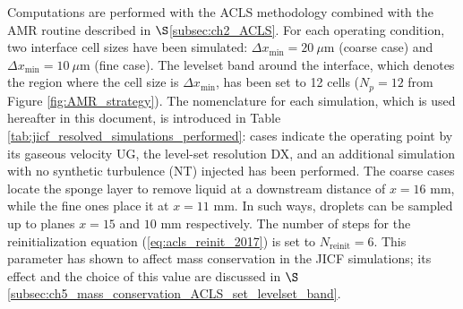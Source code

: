 Computations are performed with the ACLS methodology combined with the AMR routine described in $\S$\ref{subsec:ch2_ACLS}. For each operating condition, two interface cell sizes have been simulated: $\Delta x_\mathrm{min} = 20 ~\mu$m (coarse case) and $\Delta x_\mathrm{min} = 10 ~\mu$m (fine case). The levelset band around the interface, which denotes the region where the cell size is $\Delta x_\mathrm{min}$, has been set to 12 cells ($N_p = 12$ from Figure \ref{fig:AMR_strategy}). The nomenclature for each simulation, which is used hereafter in this document, is introduced in Table \ref{tab:jicf_resolved_simulations_performed}: cases indicate the operating point by its gaseous velocity UG, the level-set resolution DX, and an additional simulation with no synthetic turbulence (NT) injected has been performed.  The coarse cases locate the sponge layer to remove liquid at a downstream distance of $x = 16$ mm, while the fine ones place it at $x = 11$ mm. In such ways, droplets can be sampled up to planes $x = 15$ and $10$ mm respectively. The number of steps for the reinitialization equation (\ref{eq:acls_reinit_2017}) is set to $N_\mathrm{reinit} = 6$. This parameter has shown to affect mass conservation in the JICF simulations; its effect and the choice of this value are discussed in $\S$\ref{subsec:ch5_mass_conservation_ACLS_set_levelset_band}.




